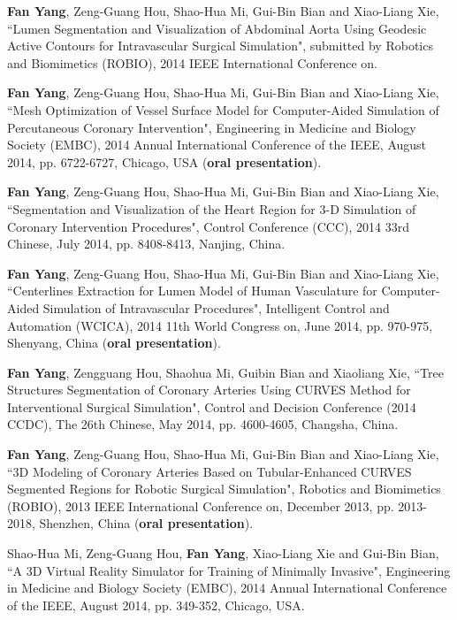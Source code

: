 
\begin{publications}{99}

\item \textbf{Fan Yang}, Zeng-Guang Hou, Shao-Hua Mi, Gui-Bin Bian and Xiao-Liang Xie, ``Lumen Segmentation and Visualization of Abdominal Aorta Using Geodesic Active Contours for Intravascular Surgical Simulation", submitted by Robotics and Biomimetics (ROBIO), 2014 IEEE International Conference on.%

\item \textbf{Fan Yang}, Zeng-Guang Hou, Shao-Hua Mi, Gui-Bin Bian and Xiao-Liang Xie, ``Mesh Optimization of Vessel Surface Model for Computer-Aided Simulation of Percutaneous Coronary Intervention", Engineering in Medicine and Biology Society (EMBC), 2014 Annual International Conference of the IEEE, August 2014, pp. 6722-6727, Chicago, USA (\textbf{oral presentation}).%

\item \textbf{Fan Yang}, Zeng-Guang Hou, Shao-Hua Mi, Gui-Bin Bian and Xiao-Liang Xie, ``Segmentation and Visualization of the Heart Region for 3-D Simulation of Coronary Intervention Procedures", Control Conference (CCC), 2014 33rd Chinese, July 2014, pp. 8408-8413, Nanjing, China.%

\item \textbf{Fan Yang}, Zeng-Guang Hou, Shao-Hua Mi, Gui-Bin Bian and Xiao-Liang Xie, ``Centerlines Extraction for Lumen Model of Human Vasculature for Computer-Aided Simulation of Intravascular Procedures", Intelligent Control and Automation (WCICA), 2014 11th World Congress on, June 2014, pp. 970-975, Shenyang, China (\textbf{oral presentation}).%

\item \textbf{Fan Yang}, Zengguang Hou, Shaohua Mi, Guibin Bian and Xiaoliang Xie, ``Tree Structures Segmentation of Coronary Arteries Using CURVES Method for Interventional Surgical Simulation", Control and Decision Conference (2014 CCDC), The 26th Chinese, May 2014, pp. 4600-4605, Changsha, China.%

\item \textbf{Fan Yang}, Zeng-Guang Hou, Shao-Hua Mi, Gui-Bin Bian and Xiao-Liang Xie, ``3D Modeling of Coronary Arteries Based on Tubular-Enhanced CURVES Segmented Regions for Robotic Surgical Simulation", Robotics and Biomimetics (ROBIO), 2013 IEEE International Conference on, December 2013, pp. 2013-2018, Shenzhen, China (\textbf{oral presentation}).%

\item Shao-Hua Mi, Zeng-Guang Hou, \textbf{Fan Yang}, Xiao-Liang Xie and Gui-Bin Bian, ``A 3D Virtual Reality Simulator for Training of Minimally Invasive", Engineering in Medicine and Biology Society (EMBC), 2014 Annual International Conference of the IEEE, August 2014, pp. 349-352, Chicago, USA.%


\end{publications}
